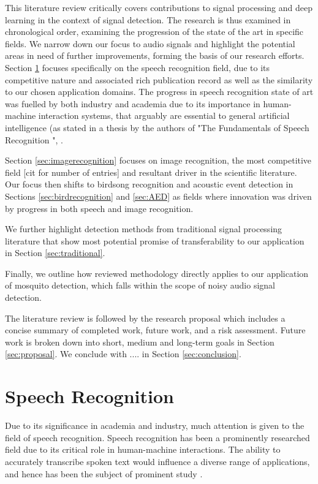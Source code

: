 \documentclass[12pt]{llncs}
\newcommand{\ikn}[1]{\todo[size = \small, color=orange!30]{[ik] #1}}
\begin{document}
This literature review critically covers contributions to signal processing and deep learning in the context of signal detection.
The research is thus  examined in chronological order, examining the progression of the state of the art in specific fields. We narrow down our focus to audio signals and highlight the potential areas in need of further improvements\ikn{Need to do this}, forming the basis of our research efforts. Section \ref{sec:speechrecognition} focuses specifically on the speech recognition field, due to its competitive nature and associated rich publication record as well as the similarity to our chosen application domains. The progress in speech recognition state of art was fuelled by both industry and academia due to its importance in human-machine interaction systems, that arguably are essential to general artificial intelligence (as stated in a thesis by the authors of "The Fundamentals of Speech Recognition \cite{rabiner1993fundamentals}", \cite{juang2005automatic}.

Section \ref{sec:imagerecognition} focuses on image recognition, the most competitive field [cit for number of entries] and resultant driver in the scientific literature.
Our focus then shifts to birdsong recognition and acoustic event detection in Sections \ref{sec:birdrecognition} and \ref{sec:AED} as fields where innovation was driven by progress in both speech and image recognition.

We further highlight detection methods from traditional signal  processing literature  that show most potential promise of transferability to our application in Section  \ref{sec:traditional}.

Finally, we outline how reviewed methodology directly applies to our application of mosquito detection, which falls within the scope of noisy audio signal detection.


The literature review is followed by the research proposal which includes a concise summary of completed work, future work, and a risk assessment. Future work is broken down into short, medium and long-term goals in Section \ref{sec:proposal}. We conclude with .... in Section \ref{sec:conclusion}.



\section{Speech Recognition}
\label{sec:speechrecognition}
Due to its significance in academia and industry, much attention is given to the field of speech recognition. Speech recognition has been a prominently researched field due to its critical role in human-machine interactions. The ability to accurately transcribe spoken text would influence a diverse range of applications, and hence has been the subject of prominent study \cite{juang2005automatic}. 
\end{document}
